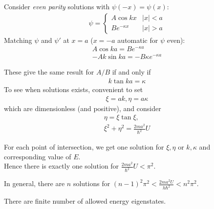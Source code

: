 \documentclass[a4paper]{article}
\begin{document}
Consider \emph{even parity} solutions with $\psi\left(-x\right) = \psi\left(x\right)$:\begin{equation*}
\begin{aligned}
\psi = \left\{\begin{array}{ll}
A\cos kx & |x|<a\\
Be^{-\kappa x} & |x|>a
\end{array}
\right.
\end{aligned}
\end{equation*}
Matching $\psi$ and $\psi'$ at $x=a$ ($x=-a$ automatic for $\psi$ even):
\begin{equation*}
\begin{aligned}
A\cos ka = Be^{-\kappa a}\\
-Ak\sin ka = -B \kappa e^{-\kappa a}
\end{aligned}
\end{equation*}

These give the same result for $A/B$ if and only if
\begin{equation*}
\begin{aligned}
k\tan ka = \kappa
\end{aligned}
\end{equation*}
To see when solutions exists, convenient to set
\begin{equation*}
\begin{aligned}
\xi = ak, \eta = a\kappa
\end{aligned}
\end{equation*}
which are dimensionless (and positive), and consider
\begin{equation*}
\begin{aligned}
\eta = \xi \tan \xi,\\
\xi^2 + \eta^2 = \frac{2ma^2}{\hbar^2} U
\end{aligned}
\end{equation*}

For each point of intersection, we get one solution for $\xi,\eta$ or $k,\kappa$ and corresponding value of $E$.\\
Hence there is exactly one solution for $\frac{2ma^2}{\hbar^2}U < \pi^2$.

In general, there are $n$ solutions for $\left(n-1\right)^2 \pi^2 < \frac{2ma^2U}{h\hbar^2} < n^2\pi^2$.

There are finite number of allowed energy eigenstates.

\end{document}

